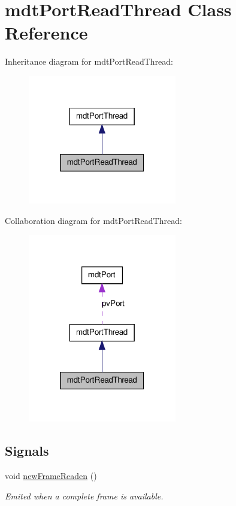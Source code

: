 \hypertarget{classmdt_port_read_thread}{
\section{mdtPortReadThread Class Reference}
\label{classmdt_port_read_thread}
}


Inheritance diagram for mdtPortReadThread:\nopagebreak
\begin{figure}[H]
\begin{center}
\leavevmode
\includegraphics[width=184pt]{classmdt_port_read_thread__inherit__graph}
\end{center}
\end{figure}


Collaboration diagram for mdtPortReadThread:\nopagebreak
\begin{figure}[H]
\begin{center}
\leavevmode
\includegraphics[width=184pt]{classmdt_port_read_thread__coll__graph}
\end{center}
\end{figure}
\subsection*{Signals}
\begin{DoxyCompactItemize}
\item 
void \hyperlink{classmdt_port_read_thread_ae52a6651f6a7048bb16e64d68e3583f8}{newFrameReaden} ()
\begin{DoxyCompactList}\small\item\em Emited when a complete frame is available. \end{DoxyCompactList}\end{DoxyCompactItemize}
